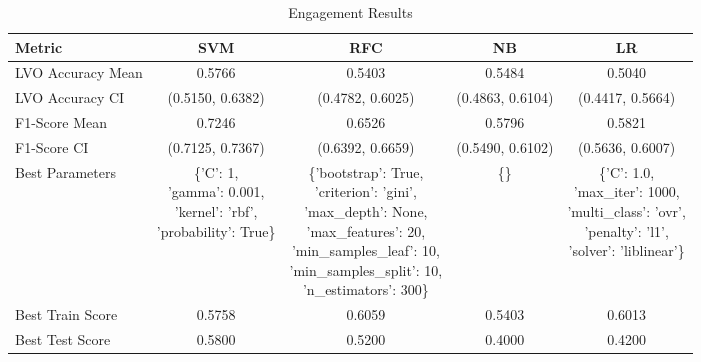 \begin{table}[h!]
\centering
\begin{tabular}{|l|c|c|c|c|}
\hline
\textbf{Metric}           & \textbf{SVM}    & \textbf{RFC}    & \textbf{NB}     & \textbf{LR}     \\ \hline
LVO Accuracy Mean         & 0.5766          & 0.5403          & 0.5484          & 0.5040          \\ \hline
LVO Accuracy CI           & (0.5150, 0.6382)& (0.4782, 0.6025)& (0.4863, 0.6104)& (0.4417, 0.5664)\\ \hline
F1-Score Mean             & 0.7246          & 0.6526          & 0.5796          & 0.5821          \\ \hline
F1-Score CI               & (0.7125, 0.7367)& (0.6392, 0.6659)& (0.5490, 0.6102)& (0.5636, 0.6007)\\ \hline
Best Parameters           & \makecell[l]{\{'C': 1,\\ 'gamma': 0.001,\\ 'kernel': 'rbf',\\ 'probability': True\}} & \makecell[l]{\{'bootstrap': True,\\ 'criterion': 'gini',\\ 'max\_depth': None,\\ 'max\_features': 20,\\ 'min\_samples\_leaf': 10,\\ 'min\_samples\_split': 10,\\ 'n\_estimators': 300\}} & \{\} & \makecell[l]{\{'C': 1.0,\\ 'max\_iter': 1000,\\ 'multi\_class': 'ovr',\\ 'penalty': 'l1',\\ 'solver': 'liblinear'\}} \\ \hline
Best Train Score          & 0.5758          & 0.6059          & 0.5403          & 0.6013          \\ \hline
Best Test Score           & 0.5800          & 0.5200          & 0.4000          & 0.4200          \\ \hline
\end{tabular}
\caption{Engagement Results}
\label{table:engagement}
\end{table}
